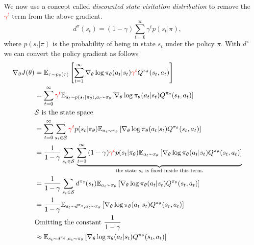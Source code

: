 We now use a concept called \textit{discounted state visitation distribution} to remove the \textcolor{red}{$\gamma^t$} term from the above gradient. 
\[
    d^\pi(s_t) = (1 - \gamma) \sum_{t=0}^{\infty}{\gamma^t p(s_t | \pi)},
\]
where $p(s_t | \pi)$ is the probability of being in state $s_t$ under the policy $\pi$. 
With $d^\pi$ we can convert the policy gradient as follows
\begin{equation}
    \begin{aligned}
         \nabla_\theta J(\theta) &  = \mathbb{E}_{\tau \sim p_\theta(\tau)}\left[ \sum_{t=1}^{\infty} \nabla_\theta \log \pi_{\theta}(a_t | s_t)   \textcolor{red}{\gamma^t} Q^{\pi_\theta}(s_t, a_t)  \right] \\
         & = \sum_{t=0}^{\infty}{ \textcolor{red}{\gamma^t} \mathbb{E}_{s_t \sim p(s_t | \pi_\theta), a_t \sim \pi_\theta}{\left[ \nabla_\theta \log \pi_{\theta}(a_t | s_t) Q^{\pi_\theta}(s_t, a_t)\right]}} \\
         & \text{$\mathcal{S}$ is the state space} \\
         & = \sum_{t=0}^{\infty}{\sum_{s_t \in \mathcal{S}}^{}{    \textcolor{red}{\gamma^t} p(s_t | \pi_\theta)  \mathbb{E}_{a_t \sim \pi_\theta}\left[  \nabla_\theta \log \pi_{\theta}(a_t | s_t) Q^{\pi_\theta}(s_t, a_t) \right]       }} \\
         & = \frac{1}{1 - \gamma} \sum_{s_t \in \mathcal{S}}^{}{} \underbrace{  \sum_{t=0}^{\infty}{    (1 - \gamma) \textcolor{red}{\gamma^t} p(s_t | \pi_\theta)  \mathbb{E}_{a_t \sim \pi_\theta}\left[  \nabla_\theta \log \pi_{\theta}(a_t | s_t) Q^{\pi_\theta}(s_t, a_t) \right]}      }_{\text{the state $s_t$ is fixed inside this term.}} \\
         & = \frac{1}{1 - \gamma} \sum_{s_t \in \mathcal{S}}^{}{ d^{\pi_\theta}(s_t)  \mathbb{E}_{a_t \sim \pi_\theta}\left[  \nabla_\theta \log \pi_{\theta}(a_t | s_t) Q^{\pi_\theta}(s_t, a_t) \right]} \\
         & = \frac{1}{1 - \gamma} \mathbb{E}_{s_t \sim d^{\pi_\theta}, a_t \sim \pi_{\theta}}\left[  \nabla_\theta \log \pi_{\theta}(a_t | s_t) Q^{\pi_\theta}(s_t, a_t) \right] \\
         & \text{Omitting the constant $\frac{1}{1 - \gamma}$} \\
         & \approx \mathbb{E}_{s_t \sim d^{\pi_\theta}, a_t \sim \pi_{\theta}}\left[  \nabla_\theta \log \pi_{\theta}(a_t | s_t) Q^{\pi_\theta}(s_t, a_t) \right]
    \end{aligned}
\end{equation}




